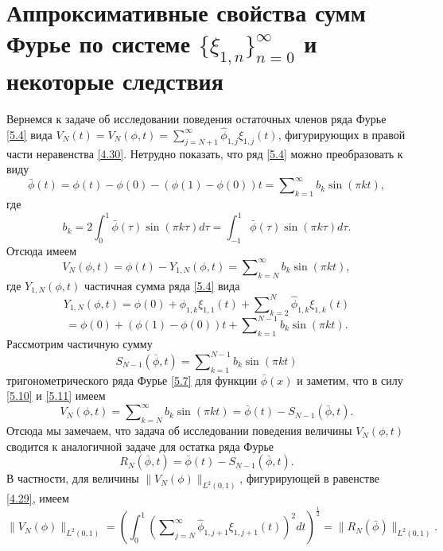 \section{Аппроксимативные свойства сумм Фурье по системе $\{\xi_{1,n}\}_{n=0}^\infty$ и некоторые следствия}
Вернемся к задаче об исследовании поведения остаточных членов ряда Фурье \eqref{5.4}   вида $V_N(t)=V_N(\phi,t)=\sum\nolimits_{j=N+1}^\infty \hat \phi_{1,j}\xi_{1,j}(t)$, фигурирующих в правой части неравенства \eqref{4.30}. Нетрудно показать, что ряд \eqref{5.4} можно преобразовать к виду
\begin{equation}\label{5.7}
\bar\phi(t)=\phi(t)-\phi(0)-(\phi(1)-\phi(0))t= \sum\nolimits_{k=1}^\infty b_k\sin(\pi kt),
\end{equation}
где
\begin{equation}\label{5.8}
b_k=2\int_{0}^1 \bar\phi(\tau)\sin(\pi k\tau)d\tau=\int_{-1}^1 \bar\phi(\tau)\sin(\pi k\tau)d\tau.
\end{equation}
Отсюда имеем
\begin{equation}\label{5.9}
V_N(\phi,t)=\phi(t)-Y_{1,N}(\phi,t)= \sum\nolimits_{k=N}^\infty b_k\sin(\pi kt),
\end{equation}
где  $Y_{1,N}(\phi,t)$ частичная сумма ряда \eqref{5.4} вида
$$
Y_{1,N}(\phi,t)= \phi(0)+\phi_{1,k}\xi_{1,1}(t)+ \sum\nolimits_{k=2}^N \hat \phi_{1,k}\xi_{1,k}(t)
$$
\begin{equation}\label{5.10}
= \phi(0)+(\phi(1)-\phi(0))t+\sum\nolimits_{k=1}^{N-1} b_k\sin(\pi kt).
\end{equation}
Рассмотрим частичную сумму
\begin{equation}\label{5.11}
S_{N-1}(\bar\phi,t)= \sum\nolimits_{k=1}^{N-1} b_k\sin(\pi kt)
\end{equation}
тригонометрического ряда Фурье \eqref{5.7} для функции $\bar\phi(x)$ и заметим, что в силу \eqref{5.10} и \eqref{5.11} имеем
\begin{equation}\label{5.12}
V_N(\phi,t)= \sum\nolimits_{k=N}^{\infty} b_k\sin(\pi kt)=\bar\phi(t)-S_{N-1}(\bar\phi,t).
\end{equation}
Отсюда мы замечаем, что задача об исследовании поведения величины $V_N(\phi,t)$ сводится к аналогичной задаче для остатка ряда Фурье
\begin{equation}\label{5.13}
R_N(\bar\phi,t)= \bar\phi(t)-S_{N-1}(\bar\phi,t).
\end{equation}
В частности, для величины $\|V_N(\phi)\|_{L^2(0,1)}$, фигурирующей в равенстве \eqref{4.29}, имеем
\begin{equation}\label{5.14}
\|V_N(\phi)\|_{L^2(0,1)}=\left(\int_{0}^1\left(\sum\nolimits_{j=N}^\infty \hat \phi_{1,j+1}\xi_{1,j+1}(t)\right)^2 dt\right)^\frac12=\|R_N(\bar\phi)\|_{L^2(0,1)}.
\end{equation}
